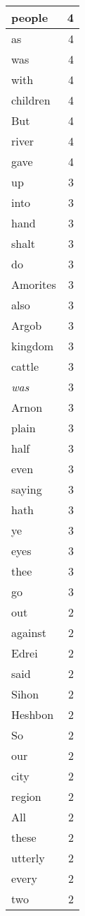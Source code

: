 \begin{center}
\begin{longtable}{l|r}
people & 4 \\ \hline
as & 4 \\ \hline
was & 4 \\ \hline
with & 4 \\ \hline
children & 4 \\ \hline
But & 4 \\ \hline
river & 4 \\ \hline
gave & 4 \\ \hline
up & 3 \\ \hline
into & 3 \\ \hline
hand & 3 \\ \hline
shalt & 3 \\ \hline
do & 3 \\ \hline
Amorites & 3 \\ \hline
also & 3 \\ \hline
Argob & 3 \\ \hline
kingdom & 3 \\ \hline
cattle & 3 \\ \hline
\emph{was} & 3 \\ \hline
Arnon & 3 \\ \hline
plain & 3 \\ \hline
half & 3 \\ \hline
even & 3 \\ \hline
saying & 3 \\ \hline
hath & 3 \\ \hline
ye & 3 \\ \hline
eyes & 3 \\ \hline
thee & 3 \\ \hline
go & 3 \\ \hline
out & 2 \\ \hline
against & 2 \\ \hline
Edrei & 2 \\ \hline
said & 2 \\ \hline
Sihon & 2 \\ \hline
Heshbon & 2 \\ \hline
So & 2 \\ \hline
our & 2 \\ \hline
city & 2 \\ \hline
region & 2 \\ \hline
All & 2 \\ \hline
these & 2 \\ \hline
utterly & 2 \\ \hline
every & 2 \\ \hline
two & 2 \\ \hline

\end{longtable}
\end{center}
